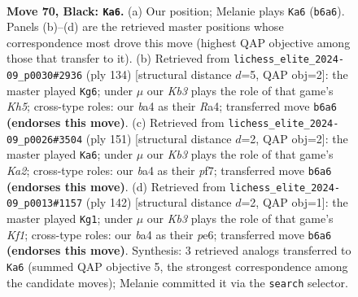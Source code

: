 \documentclass[11pt]{article}
\begin{document}
\clearpage

\begin{figure}[p]\centering
\begin{subfigure}{0.46\textwidth}\centering
\resizebox{\linewidth}{!}{%
\newchessgame
\chessboard[
  setfen={8/5R2/1k6/5P2/B7/8/5K1P/8 b - - 2 70},
  showmover=false,
  pgfstyle=straightmove, color=movearrow, markmove={b6-a6}
]}
\caption{}
\end{subfigure}\hfill
\begin{subfigure}{0.46\textwidth}\centering
\resizebox{\linewidth}{!}{%
\newchessgame
\chessboard[
  setfen={8/2k5/8/5P1K/R7/6p1/8/6r1 w - - 0 68},
  showmover=false,
  pgfstyle=straightmove, color=movearrow, markmove={h5-g6}
]}
\caption{}
\end{subfigure}
\\[4pt]
\begin{subfigure}{0.46\textwidth}\centering
\resizebox{\linewidth}{!}{%
\newchessgame
\chessboard[
  setfen={7R/k4P2/2K5/8/7P/8/8/8 b - - 0 76},
  showmover=false,
  pgfstyle=straightmove, color=movearrow, markmove={a7-a6}
]}
\caption{}
\end{subfigure}\hfill
\begin{subfigure}{0.46\textwidth}\centering
\resizebox{\linewidth}{!}{%
\newchessgame
\chessboard[
  setfen={8/8/4p3/8/5k2/8/2pr4/5K2 w - - 0 72},
  showmover=false,
  pgfstyle=straightmove, color=movearrow, markmove={f1-g1}
]}
\caption{}
\end{subfigure}
\caption{\textbf{Move 70, Black: \texttt{Ka6}.} (a) Our position; Melanie plays \texttt{Ka6} (\texttt{b6a6}). Panels (b)--(d) are the retrieved master positions whose correspondence most drove this move (highest QAP objective among those that transfer to it). (b) Retrieved from \texttt{lichess\_elite\_2024-09\_p0030\#2936} (ply 134) [structural distance $d$=5, QAP obj=2]: the master played \texttt{Kg6}; under $\mu$ our \emph{Kb3} plays the role of that game's \emph{Kh5}; cross-type roles: our \emph{b}a4 as their \emph{R}a4; transferred move \texttt{b6a6} \textbf{(endorses this move)}. (c) Retrieved from \texttt{lichess\_elite\_2024-09\_p0026\#3504} (ply 151) [structural distance $d$=2, QAP obj=2]: the master played \texttt{Ka6}; under $\mu$ our \emph{Kb3} plays the role of that game's \emph{Ka2}; cross-type roles: our \emph{b}a4 as their \emph{p}f7; transferred move \texttt{b6a6} \textbf{(endorses this move)}. (d) Retrieved from \texttt{lichess\_elite\_2024-09\_p0013\#1157} (ply 142) [structural distance $d$=2, QAP obj=1]: the master played \texttt{Kg1}; under $\mu$ our \emph{Kb3} plays the role of that game's \emph{Kf1}; cross-type roles: our \emph{b}a4 as their \emph{p}e6; transferred move \texttt{b6a6} \textbf{(endorses this move)}. Synthesis: 3 retrieved analogs transferred to \texttt{Ka6} (summed QAP objective 5, the strongest correspondence among the candidate moves); Melanie committed it via the \texttt{search} selector.}
\label{fig:thought-m139}
\end{figure}
\end{document}
